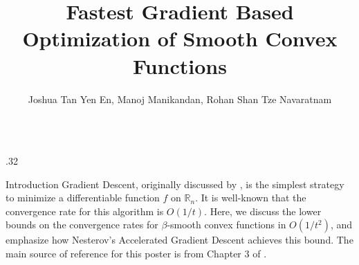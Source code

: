 \documentclass[final,t]{beamer}
\title{Fastest Gradient Based Optimization of Smooth Convex Functions}
\author{\Large Joshua Tan Yen En, Manoj Manikandan, Rohan Shan Tze Navaratnam}
\institute{Department of Computer Science, University of Manchester}
\begin{document}
\begin{frame}[containsverbatim]

\begin{columns}[t]


\begin{column}{.32\linewidth}
    \vspace{-10mm}

    \begin{exampleblock}{Introduction}
    Gradient Descent, originally discussed by \cite{cauchy1847methode}, is the simplest strategy to minimize a differentiable function
    $f$ on $\mathbb{R}_n$. It is well-known that the convergence rate for this algorithm is
    $O(1/t)$. Here, we discuss the lower bounds on the convergence rates for $\beta$-smooth convex functions in
    $O(1/t^2)$, and emphasize how Nesterov's Accelerated Gradient Descent achieves this bound. The main source of reference for this poster is from Chapter 3 of
    \cite{bubeck2015convex}.
    \end{exampleblock}


\end{column}
\end{columns}
\end{frame}
\end{document}
